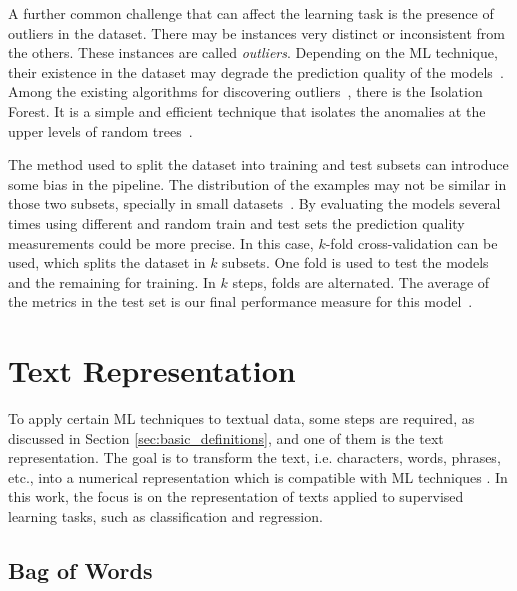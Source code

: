 A further common challenge that can affect the learning task is the presence of outliers in the dataset. There may be instances very distinct or inconsistent from the others. These instances are called \textit{outliers}. Depending on the \gls{ML} technique, their existence in the dataset may degrade the prediction quality of the models~\cite{Freeman1995}. 
Among the existing algorithms for discovering outliers~\cite{Hodge2004}, there is the Isolation Forest. It is a simple and efficient technique that isolates the anomalies at the upper levels of random trees~\cite{Liu2008}.


The method used to split the dataset into training and test subsets can introduce some bias in the pipeline. The distribution of the examples may not be similar in those two subsets, specially in small datasets~\cite{Hawkins2004}. By evaluating the models several times using different and random train and test sets the prediction quality measurements could be more precise. In this case, $k$-fold cross-validation can be used, which splits the dataset in $k$ subsets. One fold is used to test the models and the remaining for training. In $k$ steps, folds are alternated. The average of the metrics in the test set is our final performance measure for this model~\cite{Kuhn2013}. 

\section{Text Representation}



To apply certain \gls{ML} techniques to textual data, some steps are required, as discussed in Section \ref{sec:basic_definitions}, and one of them is the text representation. The goal is to transform the text, i.e.  characters, words, phrases, etc., into a numerical representation which is compatible with \gls{ML} techniques \cite{Kowsari2019}. 
In this work, the focus is on the representation of texts applied to supervised learning tasks, such as classification and regression.

\subsection{Bag of Words}\label{sec:bow}

